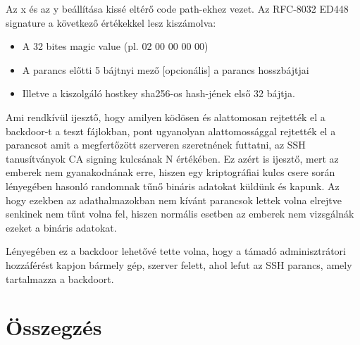 \documentclass[11pt]{article}
\begin{document}
Az x és az y beállítása kissé eltérő code path-ekhez vezet.
Az RFC-8032 ED448 signature a következő értékekkel lesz kiszámolva:
\begin{itemize}
    \item A 32 bites magic value (pl. 02 00 00 00 00)
    \item A parancs előtti 5 bájtnyi mező [opcionális] a parancs hosszbájtjai
    \item Illetve a kiszolgáló hostkey sha256-os hash-jének első 32 bájtja.
\end{itemize} 

Ami rendkívül ijesztő, hogy amilyen ködösen és alattomosan rejtették el a backdoor-t a teszt fájlokban, pont ugyanolyan alattomossággal rejtették el a parancsot amit a megfertőzött szerveren szeretnének futtatni, az SSH tanusítványok CA signing kulcsának N értékében. Ez azért is ijesztő, mert az emberek nem gyanakodnának erre, hiszen egy kriptográfiai kulcs csere során lényegében hasonló randomnak tűnő bináris adatokat küldünk és kapunk. Az hogy ezekben az adathalmazokban nem kívánt parancsok lettek volna elrejtve senkinek nem tűnt volna fel, hiszen normális esetben az emberek nem vizsgálnák ezeket a bináris adatokat.

Lényegében ez a backdoor lehetővé tette volna, hogy a támadó adminisztrátori hozzáférést kapjon bármely gép, szerver felett, ahol lefut az SSH parancs, amely tartalmazza a backdoort.\cite{YouTube_2024}

\section{Összegzés}
\end{document}
